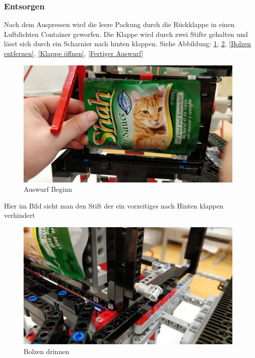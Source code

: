 \subsubsection{Entsorgen}

Nach dem Auspressen wird die leere Packung durch die Rückklappe in einen Luftdichten Container geworfen. Die Klappe wird durch zwei Stifte gehalten und lässt sich durch ein Scharnier nach hinten klappen. Siehe Abbildung: \ref{Auswurf Beginn}, \ref{Bolzen drinnen}, \ref{Bolzen entfernen}, \ref{Klappe öffnen}, \ref{Fertiger Auswurf}

\begin{figure}[H]
\begin{center}
\includegraphics[width=13cm]{Bilder/Ablauf_1_png/Auswurf_1}
\caption{Auswurf Beginn}
\label{Auswurf Beginn}
\end{center}
\end{figure}

Hier im Bild sieht man den Stift der ein vorzeitiges nach Hinten klappen verhindert

\begin{figure}[H]
\begin{center}
\includegraphics[width=13cm]{Bilder/Ablauf_1_png/Auswurf_2}
\caption{Bolzen drinnen}
\label{Bolzen drinnen}
\end{center}
\end{figure}


